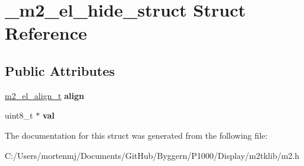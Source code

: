 \hypertarget{struct__m2__el__hide__struct}{\section{\-\_\-m2\-\_\-el\-\_\-hide\-\_\-struct Struct Reference}
\label{struct__m2__el__hide__struct}
}
\subsection*{Public Attributes}
\begin{DoxyCompactItemize}
\item 
\hypertarget{struct__m2__el__hide__struct_a7cd91668d250cfa97fe488fa37944010}{\hyperlink{struct__m2__el__align__struct}{m2\-\_\-el\-\_\-align\-\_\-t} {\bfseries align}}\label{struct__m2__el__hide__struct_a7cd91668d250cfa97fe488fa37944010}

\item 
\hypertarget{struct__m2__el__hide__struct_a4c6932abc1e42f91a17c3d3118d04bdb}{uint8\-\_\-t $\ast$ {\bfseries val}}\label{struct__m2__el__hide__struct_a4c6932abc1e42f91a17c3d3118d04bdb}

\end{DoxyCompactItemize}


The documentation for this struct was generated from the following file\-:\begin{DoxyCompactItemize}
\item 
C\-:/\-Users/mortenmj/\-Documents/\-Git\-Hub/\-Byggern/\-P1000/\-Display/m2tklib/m2.\-h\end{DoxyCompactItemize}
